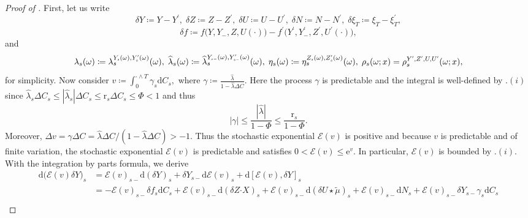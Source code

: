\documentclass[10pt]{article} %
\newcommand\cE{\mathcal E}
\newcommand{\smalltext}[1]{\text{\fontsize{4}{4}\selectfont$#1$}}
\newcommand{\bcdot}{\boldsymbol{\cdot}}
\def\d{\mathrm{d}}
\begin{document}
\begin{proof}[Proof of ]
	First, let us write 
	\begin{equation*}
		\delta Y \coloneqq Y-Y^\prime, \; \delta Z \coloneqq Z-Z^\prime, \; \delta U \coloneqq U - U^\prime, \; \delta N \coloneqq N - N^\prime, \; \delta \xi_T \coloneqq \xi_T - \xi^\prime_T,
	\end{equation*}
	\begin{equation*}
		\delta f \coloneqq f\big(Y,Y_-,Z,U(\cdot)) - f^\prime\big(Y^\prime,Y^\prime_-,Z^\prime,U^\prime(\cdot)\big),
	\end{equation*}
	and
	\begin{equation*}
		\lambda_s(\omega) \coloneqq \lambda^{Y_\smalltext{s}(\omega),Y^\smalltext{\prime}_\smalltext{s}(\omega)}_s(\omega), 
		\; \widehat\lambda_s(\omega) \coloneqq \widehat\lambda^{Y_{\smalltext{s}\smalltext{-}}(\omega),Y^\smalltext{\prime}_{\smalltext{s}\smalltext{-}}(\omega)}_s(\omega), 
		\; \eta_s(\omega) \coloneqq \eta^{Z_\smalltext{s}(\omega),Z^\smalltext{\prime}_\smalltext{s}(\omega)}_s(\omega),
		\; \rho_s(\omega;x) = \rho^{Y^\smalltext{\prime},Z^\smalltext{\prime},U,U^\smalltext{\prime}}_s(\omega;x),
	\end{equation*}
	for simplicity. Now consider $v \coloneqq \int_0^{\cdot \land T} \gamma_s \d C_s,$ where  $\gamma \coloneqq \frac{\widehat\lambda}{1-\widehat\lambda\Delta C}.$ Here the process $\gamma$ is predictable and the integral is well-defined by .$(i)$ since $\widehat\lambda_s \Delta C_s \leq |\widehat\lambda_s| \Delta C_s \leq \mathrm{r}_s\Delta C_s \leq \Phi < 1 $ and thus
	\begin{equation*}
		|\gamma| \leq \frac{|\widehat\lambda|}{1-\Phi} \leq \frac{\mathrm{r}_s}{1-\Phi}.
	\end{equation*}
	Moreover, $\Delta v = \gamma\Delta C = \widehat\lambda\Delta C/(1-\widehat\lambda\Delta C) > -1$. Thus the stochastic exponential $\cE(v)$ is positive and because $v$ is predictable and of finite variation, the stochastic exponential $\cE(v)$ is predictable and satisfies $0 < \cE(v) \leq \mathrm{e}^{v}$. In particular, $\cE(v)$ is bounded by .$(i)$.	With the integration by parts formula, we derive
	\begin{align}\label{eq::ito_comparison}
		\d \big(\cE(v)\delta Y\big)_s &= \cE(v)_{s-}\d (\delta Y)_s + \delta Y_{s-} \d \cE(v)_s + \d [\cE(v),\delta Y]_s \nonumber\\
		&= -\cE(v)_{s-} \delta f_s \d C_s + \cE(v)_{s-} \d(\delta Z \bcdot X)_s + \cE(v)_{s-}\d (\delta U \star\tilde\mu)_s + \cE(v)_{s-}\d N_s + \cE(v)_{s-}\delta Y_{s-}\gamma_s\d C_s \nonumber\\

\end{align}
\end{proof}
\end{document}
